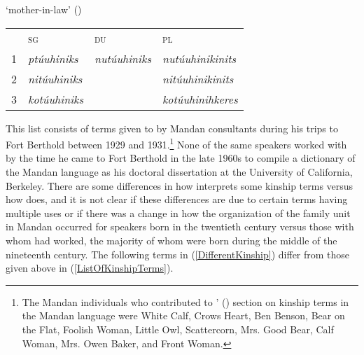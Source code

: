 \begin{exe}
\begin{xlist}
\item\label{ListOfKinshipTerms24} `mother-in-law' (\Male)

    \begin{tabular}{llll}
    ~ &\textsc{sg}&\textsc{du}&\textsc{pl}\\
    1&  \textit{ptúuhiniks}&   \textit{nutúuhiniks}                                         &\textit{nutúuhinikinits}\\
    2&  \textit{nitúuhiniks}&    &\textit{nitúuhinikinits}\\
    3&  \textit{kotúuhiniks}&    &\textit{kotúuhinihkeres}
    \end{tabular}

\end{xlist}

\end{exe}

This list consists of terms given to \citet{bowers1950} by Mandan consultants during his trips to Fort Berthold between 1929 and 1931.\footnote{The Mandan individuals who contributed to \citeauthor{bowers1950}' (\citeyear[4]{bowers1950}) section on kinship terms in the Mandan language were White Calf, Crows Heart, Ben Benson, Bear on the Flat, Foolish Woman, Little Owl, Scattercorn, Mrs. Good Bear, Calf Woman, Mrs. Owen Baker, and Front Woman.} None of the same speakers worked with \citet{hollow1970} by the time he came to Fort Berthold in the late 1960s to compile a dictionary of the Mandan language as his doctoral dissertation at the University of California, Berkeley. There are some differences in how \citeauthor{hollow1970} interprets some kinship terms versus how \citeauthor{bowers1950} does, and it is not clear if these differences are due to certain terms having multiple uses or if there was a change in how the organization of the family unit in Mandan occurred for speakers born in the twentieth century versus those with whom \citeauthor{bowers1950} had worked, the majority of whom were born during the middle of the nineteenth century. The following terms in (\ref{DifferentKinship}) differ from those given above in (\ref{ListOfKinshipTerms}). 

